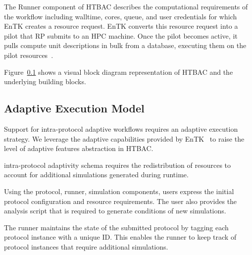 The Runner component of HTBAC describes the computational requirements of the 
workflow including walltime, cores, queue, and user credentials 
 for which EnTK creates a resource request. 
EnTK converts this resource request into a pilot that RP submits to an HPC 
machine. Once the pilot becomes active, it pulls compute unit descriptions in 
bulk from a database, executing them on the pilot 
resources~\cite{merzky2015radical}. 

Figure~\ref{} shows a visual block diagram representation
 of HTBAC and the underlying building
blocks.

\subsection{Adaptive Execution Model}

Support for intra-protocol adaptive workflows requires an adaptive execution 
strategy. We leverage the adaptive capabilities provided by 
EnTK~\cite{adaptivebiomolecular} to raise the level of adaptive features 
abstraction in HTBAC. 

intra-protocol adaptivity schema requires the 
redistribution of resources to account for additional simulations generated 
during runtime. 


Using the protocol, runner, simulation components, users express the initial 
protocol configuration and resource requirements. The user also provides the 
analysis script that is required to generate conditions of new simulations. 


The runner maintains the state of the submitted protocol by tagging each 
protocol instance with a unique ID. This enables the runner to keep track of
protocol instances that require additional simulations. 

